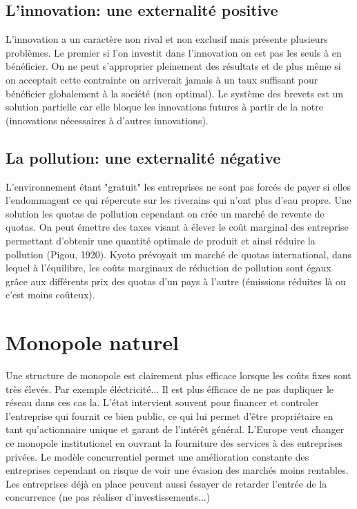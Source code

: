 \subsection{L'innovation: une externalité positive} %
\label{sub:l_innovation_une_externalite_positive}

L'innovation a un caractère non rival et non exclusif mais présente plusieurs problèmes. Le premier si l'on investit dans l'innovation on est pas les seuls à en bénéficier. On ne peut s'approprier pleinement des résultats et de plus même si on acceptait cette contrainte on arriverait jamais à un taux suffisant pour bénéficier globalement à la société (non optimal). Le système des brevets est un solution partielle car elle bloque les innovations futures à partir de la notre (innovations nécessaires à d'autres innovations). 

\subsection{La pollution: une externalité négative} %
\label{sub:la_pollution_une_externalite_negative}

L'environnement étant "gratuit" les entreprises ne sont pas forcés de payer si elles l'endommagent ce qui répercute sur les riverains qui n'ont plus d'eau propre. Une solution les quotas de pollution cependant on crée un marché de revente de quotas. On peut émettre des taxes visant à élever le coût marginal des entreprise permettant d'obtenir une quantité optimale de produit et ainsi réduire la pollution (Pigou, 1920). Kyoto prévoyait un marché de quotas international, dans lequel à l'équilibre, les coûts marginaux de réduction de pollution sont égaux grâce aux différents prix des quotas d'un pays à l'autre (émissions réduites là ou c'est moins coûteux).

\section{Monopole naturel} %
\label{sec:monopole_naturel}

Une structure de monopole est clairement plus efficace lorsque les coûts fixes sont très élevés. Par exemple éléctricité... Il est plus éfficace de ne pas dupliquer le réseau dans ces cas la. L'état intervient souvent pour financer et controler l'entreprise qui fournit ce bien public, ce qui lui permet d'être propriétaire en tant qu'actionnaire unique et garant de l'intérêt général. L'Europe veut changer ce monopole institutionel en ouvrant la fourniture des services à des entreprises privées. Le modèle concurrentiel permet une amélioration constante des entreprises cependant on risque de voir une évasion des marchés moins rentables. Les entreprises déjà en place peuvent aussi éssayer de retarder l'entrée de la concurrence (ne pas réaliser d'investissements...)

